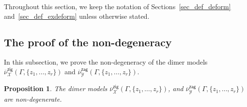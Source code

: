 \documentclass[11pt]{article}
\numberwithin{equation}{section}
\numberwithin{equation}{section}
\numberwithin{figure}{section}
\numberwithin{table}{section}
\newtheorem{Proposition}[Theorem]{Proposition}
 { \theoremstyle{definition}
\newtheorem{Definition}[Theorem]{Definition}
\newtheorem{Note}[Theorem]{Note}
\newtheorem{Example}[Theorem]{Example}
\newtheorem{Remark}[Theorem]{Remark}
\newtheorem{observation}[Theorem]{Observation}
\newtheorem{operation}[Theorem]{Operation}
\newtheorem{setting}[Theorem]{Setting}}
\newcommand{\calX}{\mathcal{X}}
\newcommand{\calY}{\mathcal{Y}}
\newcommand{\zig}{\mathsf{zig}}
\newcommand{\zag}{\mathsf{zag}}
\begin{document}
Throughout this section, we keep the notation of Sections~\ref{sec_def_deform} and~\ref{sec_def_exdeform} unless otherwise stated.

\subsection{The proof of the non-degeneracy}\label{subsec_nondegenerate_deformation}

In this subsection, we prove the non-degeneracy of the dimer models $\overline{\nu}^\zig_\calX(\Gamma, \{z_1,\dots,z_r\})$ and $\overline{\nu}^\zag_\calY(\Gamma, \{z_1,\dots,z_r\})$.

\begin{Proposition}\label{prop_nondegenerate}
The dimer models $\overline{\nu}^\zig_\calX(\Gamma, \{z_1,\dots,z_r\})$, and $\overline{\nu}^\zag_\calY(\Gamma, \{z_1,\dots,z_r\})$ are non-degenerate.
\end{Proposition}
\end{document}
